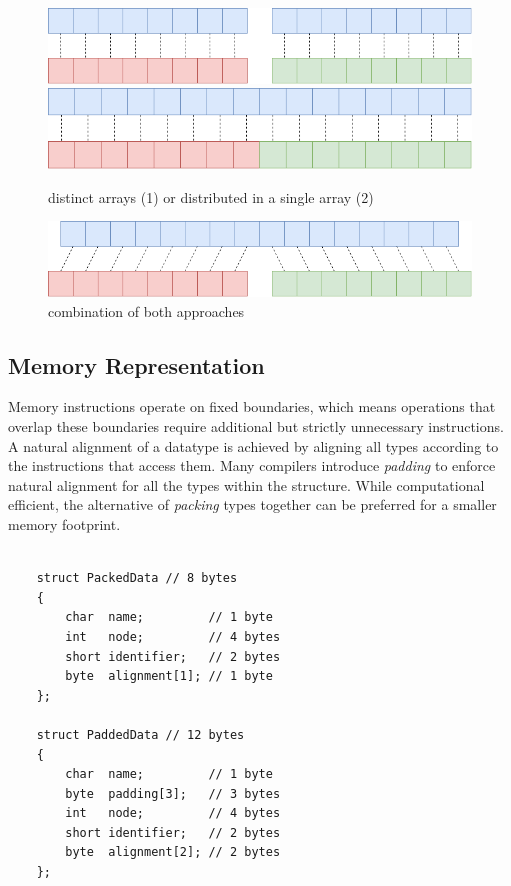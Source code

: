 \documentclass{article}
\begin{document}
\begin{figure}[ht]
    \centering
    \includegraphics[scale=0.3]{variant1}
    \hspace{10pt}
    \includegraphics[scale=0.3]{variant2}
    \caption{distinct arrays (1) or distributed in a single array (2)}
\end{figure}

\begin{figure}[ht]
    \centering
    \includegraphics[scale=0.3]{variant3}
    \caption{combination of both approaches}
\end{figure}

\newpage

\subsection{Memory Representation}

Memory instructions operate on fixed boundaries, which means operations that overlap these boundaries require additional but strictly unnecessary instructions.
A natural alignment of a datatype is achieved by aligning all types according to the instructions that access them.
Many compilers introduce {\it padding} to enforce natural alignment for all the types within the structure.
While computational efficient, the alternative of {\it packing} types together can be preferred for a smaller memory footprint.  

\begin{verbatim}

    struct PackedData // 8 bytes
    {
        char  name;         // 1 byte
        int   node;         // 4 bytes
        short identifier;   // 2 bytes
        byte  alignment[1]; // 1 byte
    };

    struct PaddedData // 12 bytes
    {
        char  name;         // 1 byte
        byte  padding[3];   // 3 bytes
        int   node;         // 4 bytes
        short identifier;   // 2 bytes
        byte  alignment[2]; // 2 bytes
    };    

\end{verbatim}
\end{document}
